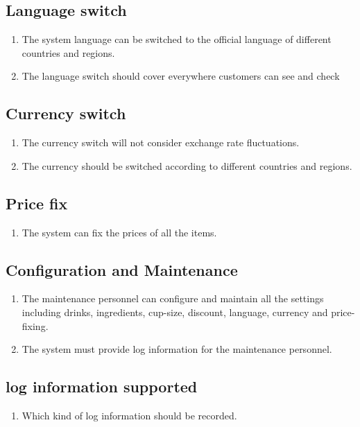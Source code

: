 \documentclass[a4paper]{report}
\begin{document}
\subsection{Language switch}
\begin{enumerate}
\item The system language can be switched to the official language of different countries and regions.
\item The language switch should cover everywhere customers can see and check
\end{enumerate}

\subsection{Currency switch}
\begin{enumerate}
\item The currency switch will not consider exchange rate fluctuations.
\item The currency should be switched according to different countries and regions.
\end{enumerate}

\subsection{Price fix}
\begin{enumerate}
\item The system can fix the prices of all the items.
\end{enumerate}



\subsection{Configuration and Maintenance}
\begin{enumerate}
\item The maintenance personnel can configure and maintain all the settings including drinks, ingredients, cup-size, discount, language, currency and price-fixing.
\item The system must provide log information for the maintenance personnel.
\end{enumerate}


\subsection{log information supported}
\begin{enumerate}
\item Which kind of log information should be recorded.
\end{enumerate}
\end{document}
